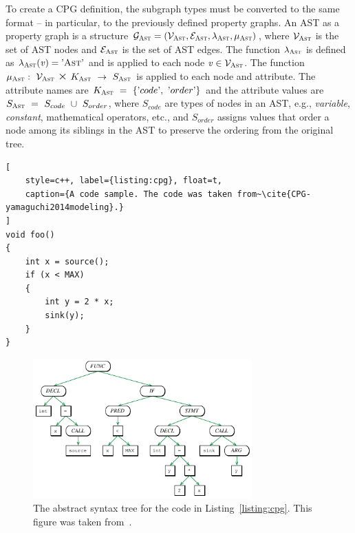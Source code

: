 To create a CPG definition, the subgraph types must be converted to the same format -- in particular, to the previously defined property graphs. An AST as a property graph is a structure $\mathcal{G}_{\textsc{Ast}} = (\mathcal{V}_{\textsc{Ast}}, \mathcal{E}_{\textsc{Ast}}, \lambda_{\textsc{Ast}}, \mu_{\textsc{Ast}})$, where $\mathcal{V}_{\textsc{Ast}}$ is the set of AST nodes and $\mathcal{E}_{\textsc{Ast}}$ is the set of AST edges. The function $\lambda_{\textsc{Ast}}$ is defined as $\lambda_{\textsc{Ast}}(\mathit{v}) = \textrm'\textsc{Ast}\textrm'$ and is applied to each node $\mathit{v} \in \mathcal{V}_{\textsc{Ast}}$. The function~$\mu_{\textsc{Ast}}:~\mathcal{V_{\textsc{Ast}}}~\bigtimes~K_{\textsc{Ast}}~\rightarrow~S_{\textsc{Ast}}$ is applied to each node and attribute. The attribute names are $K_{\textsc{Ast}}~=~\{\textrm'code\textrm',~\textrm'order\textrm'\}$ and the attribute values are $S_{\textsc{Ast}}~=~S_{code}~\cup~S_{order}$, where $S_{code}$ are types of nodes in an AST, e.g., \textit{variable}, \textit{constant}, mathematical operators, etc., and $S_{order}$ assigns values that order a node among its siblings in the AST to preserve the ordering from the original tree.

\begin{lstlisting}[
    style=c++, label={listing:cpg}, float=t,
    caption={A code sample. The code was taken from~\cite{CPG-yamaguchi2014modeling}.}
]
void foo()
{
    int x = source();
    if (x < MAX)
    {
        int y = 2 * x;
        sink(y);
    }
}
\end{lstlisting}

\begin{figure}[t]
	\centering
	\includegraphics[width=0.75\textwidth]{figures/AST.pdf}
	\caption{The abstract syntax tree for the code in Listing~\ref{listing:cpg}. This figure was taken from~\cite{CPG-yamaguchi2014modeling}.}
	\label{figure:AST}
\end{figure}

